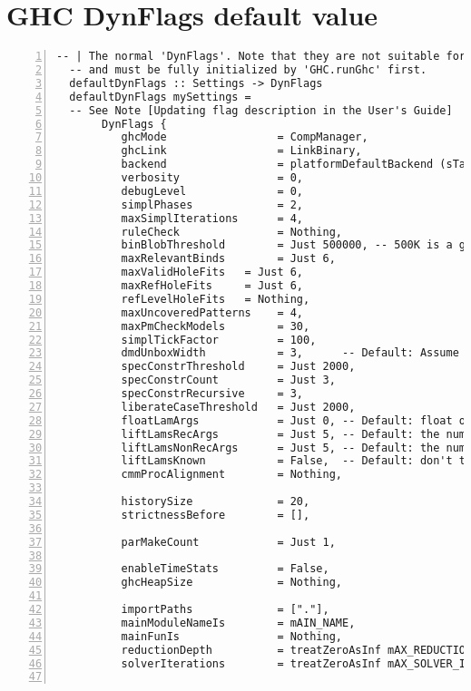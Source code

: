 \documentclass[en]{pracamgr}
\begin{document}
\chapter{GHC DynFlags default value}
\label{appendix:defval}
\begin{lstlisting}[numbers=left,stepnumber=1]
  -- | The normal 'DynFlags'. Note that they are not suitable for use in this form
  -- and must be fully initialized by 'GHC.runGhc' first.
  defaultDynFlags :: Settings -> DynFlags
  defaultDynFlags mySettings =
  -- See Note [Updating flag description in the User's Guide]
       DynFlags {
          ghcMode                 = CompManager,
          ghcLink                 = LinkBinary,
          backend                 = platformDefaultBackend (sTargetPlatform mySettings),
          verbosity               = 0,
          debugLevel              = 0,
          simplPhases             = 2,
          maxSimplIterations      = 4,
          ruleCheck               = Nothing,
          binBlobThreshold        = Just 500000, -- 500K is a good default (see #16190)
          maxRelevantBinds        = Just 6,
          maxValidHoleFits   = Just 6,
          maxRefHoleFits     = Just 6,
          refLevelHoleFits   = Nothing,
          maxUncoveredPatterns    = 4,
          maxPmCheckModels        = 30,
          simplTickFactor         = 100,
          dmdUnboxWidth           = 3,      -- Default: Assume an unboxed demand on function bodies returning a triple
          specConstrThreshold     = Just 2000,
          specConstrCount         = Just 3,
          specConstrRecursive     = 3,
          liberateCaseThreshold   = Just 2000,
          floatLamArgs            = Just 0, -- Default: float only if no fvs
          liftLamsRecArgs         = Just 5, -- Default: the number of available argument hardware registers on x86_64
          liftLamsNonRecArgs      = Just 5, -- Default: the number of available argument hardware registers on x86_64
          liftLamsKnown           = False,  -- Default: don't turn known calls into unknown ones
          cmmProcAlignment        = Nothing,
  
          historySize             = 20,
          strictnessBefore        = [],
  
          parMakeCount            = Just 1,
  
          enableTimeStats         = False,
          ghcHeapSize             = Nothing,
  
          importPaths             = ["."],
          mainModuleNameIs        = mAIN_NAME,
          mainFunIs               = Nothing,
          reductionDepth          = treatZeroAsInf mAX_REDUCTION_DEPTH,
          solverIterations        = treatZeroAsInf mAX_SOLVER_ITERATIONS,
  

\end{lstlisting}
\end{document}

